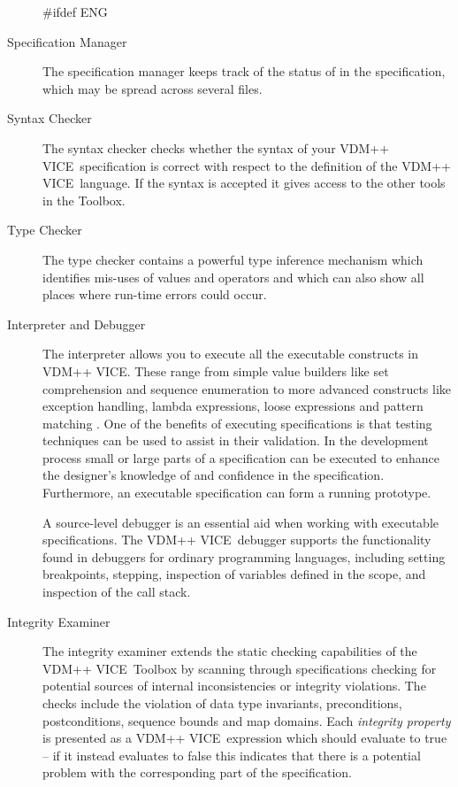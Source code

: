 \documentclass[\pformat,12pt]{article}
\newcommand{\vdmslpp}{VDM-SL}
\newcommand{\Toolbox}{Toolbox}
\newcommand{\vdmslpp}{VDM++}
\newcommand{\Toolbox}{Toolbox}
\renewcommand{\vdmslpp}{VDM++ VICE}
\begin{document}
\begin{description}
  
#ifdef ENG
\item[Specification Manager] The specification manager keeps track of
  the status of  in the
  specification, which may be spread across several files.
 
\item[Syntax Checker] The syntax checker checks whether the syntax of
your \vdmslpp\ specification is correct with respect to the definition
of the \vdmslpp\ language. If the syntax is accepted it gives access
to the other tools in the \Toolbox.

\item[Type Checker]
  The type checker contains a powerful type inference mechanism which
  identifies mis-uses of values and operators and which can also show all
  places where run-time errors could occur.

\item[Interpreter and Debugger] The interpreter allows you
  to execute all the executable constructs in \vdmslpp. These range
  from simple value builders like set comprehension and sequence
  enumeration to more advanced constructs like exception handling,
  lambda expressions, loose expressions and pattern matching%
.  One of
  the benefits of executing specifications is that testing techniques
  can be used to assist in their validation. In the development
  process small or large parts of a specification can be executed to
  enhance the designer's knowledge of and confidence in the
  specification. Furthermore, an executable specification can form a
  running prototype.

  A source-level debugger is an essential aid when working
  with executable specifications. The \vdmslpp\ debugger supports the
  functionality found in debuggers for ordinary programming languages,
  including setting breakpoints, stepping, inspection of variables
  defined in the scope, and inspection of the call stack. 

\item[Integrity Examiner] The integrity examiner extends the static
  checking capabilities of the \vdmslpp\ Toolbox by scanning through
  specifications checking for potential sources of internal
  inconsistencies or integrity violations. The checks include the
  violation of data type invariants, preconditions,  postconditions,
  sequence bounds and map domains. Each \emph{integrity property} is 
  presented as a \vdmslpp\ expression which should evaluate to true --
  if it instead evaluates to false this indicates that there is a
  potential problem with the corresponding part of the specification. 


\end{description}
\end{document}
